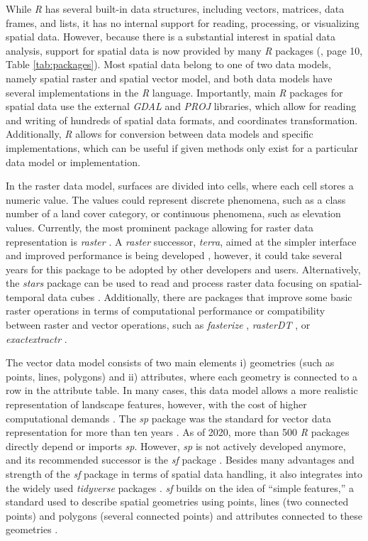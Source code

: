 \documentclass[smallextended]{svjour3}       %
\begin{document}
While \emph{R} has several built-in data structures, including vectors, matrices, data frames, and lists, it has no internal support for reading, processing, or visualizing spatial data.
However, because there is a substantial interest in spatial data analysis, support for spatial data is now provided by many \emph{R} packages (\cite{Lovelace2019}, page 10, Table \ref{tab:packages}).
Most spatial data belong to one of two data models, namely spatial raster and spatial vector model, and both data models have several implementations in the \emph{R} language.
Importantly, main \emph{R} packages for spatial data use the external \emph{GDAL} \cite{GDAL/OGRcontributors2020} and \emph{PROJ} \cite{PROJcontributors2021} libraries, which allow for reading and writing of hundreds of spatial data formats, and coordinates transformation.
Additionally, \emph{R} allows for conversion between data models and specific implementations, which can be useful if given methods only exist for a particular data model or implementation.

In the raster data model, surfaces are divided into cells, where each cell stores a numeric value.
The values could represent discrete phenomena, such as a class number of a land cover category, or continuous phenomena, such as elevation values.
Currently, the most prominent package allowing for raster data representation is \emph{raster} \cite{Hijmans2019}.
A \emph{raster} successor, \emph{terra}, aimed at the simpler interface and improved performance is being developed \cite{Hijmans2021}, however, it could take several years for this package to be adopted by other developers and users.
Alternatively, the \emph{stars} package can be used to read and process raster data focusing on spatial-temporal data cubes \cite{Pebesma2019}.
Additionally, there are packages that improve some basic raster operations in terms of computational performance or compatibility between raster and vector operations, such as \emph{fasterize} \cite{Ross2020}, \emph{rasterDT} \cite{OBrien2020}, or \emph{exactextractr} \cite{Baston2020}.

The vector data model consists of two main elements i) geometries (such as points, lines, polygons) and ii) attributes, where each geometry is connected to a row in the attribute table.
In many cases, this data model allows a more realistic representation of landscape features, however, with the cost of higher computational demands \cite{Lovelace2019}.
The \emph{sp} package was the standard for vector data representation for more than ten years \cite{Pebesma2005,Bivand2013}.
As of 2020, more than 500 \emph{R} packages directly depend or imports \emph{sp}.
However, \emph{sp} is not actively developed anymore, and its recommended successor is the \emph{sf} package \cite{Pebesma2018}.
Besides many advantages and strength of the \emph{sf} package in terms of spatial data handling, it also integrates into the widely used \emph{tidyverse} packages \cite{Wickham2019}.
\emph{sf} builds on the idea of ``simple features,'' a standard used to describe spatial geometries using points, lines (two connected points) and polygons (several connected points) and attributes connected to these geometries \cite{Pebesma2019a}.
\end{document}

